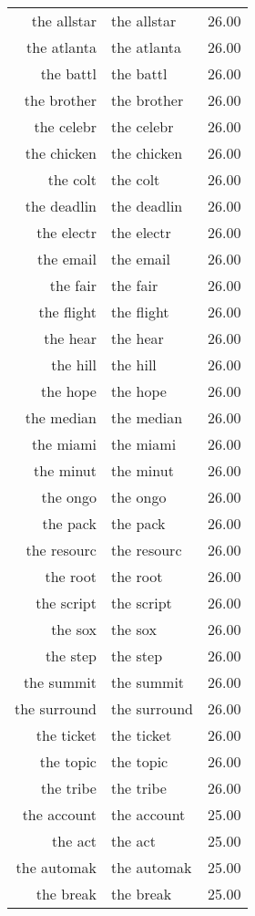 \begin{table}[ht]
\begin{tabular}{rlr}
  the allstar & the allstar & 26.00 \\ 
  the atlanta & the atlanta & 26.00 \\ 
  the battl & the battl & 26.00 \\ 
  the brother & the brother & 26.00 \\ 
  the celebr & the celebr & 26.00 \\ 
  the chicken & the chicken & 26.00 \\ 
  the colt & the colt & 26.00 \\ 
  the deadlin & the deadlin & 26.00 \\ 
  the electr & the electr & 26.00 \\ 
  the email & the email & 26.00 \\ 
  the fair & the fair & 26.00 \\ 
  the flight & the flight & 26.00 \\ 
  the hear & the hear & 26.00 \\ 
  the hill & the hill & 26.00 \\ 
  the hope & the hope & 26.00 \\ 
  the median & the median & 26.00 \\ 
  the miami & the miami & 26.00 \\ 
  the minut & the minut & 26.00 \\ 
  the ongo & the ongo & 26.00 \\ 
  the pack & the pack & 26.00 \\ 
  the resourc & the resourc & 26.00 \\ 
  the root & the root & 26.00 \\ 
  the script & the script & 26.00 \\ 
  the sox & the sox & 26.00 \\ 
  the step & the step & 26.00 \\ 
  the summit & the summit & 26.00 \\ 
  the surround & the surround & 26.00 \\ 
  the ticket & the ticket & 26.00 \\ 
  the topic & the topic & 26.00 \\ 
  the tribe & the tribe & 26.00 \\ 
  the account & the account & 25.00 \\ 
  the act & the act & 25.00 \\ 
  the automak & the automak & 25.00 \\ 
  the break & the break & 25.00 \\ 

\end{tabular}
\end{table}
